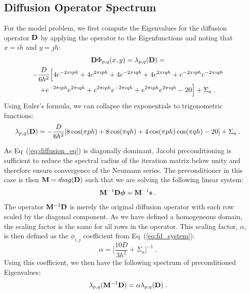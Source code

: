 \documentclass{mc2013}
\begin{document}
\subsection{Diffusion Operator Spectrum}
\label{subsec:diffusion_spectrum}

For the model problem, we first compute the Eigenvalues for the
diffusion operator $\mathbf{D}$ by applying the operator to the
Eigenfunctions and noting that $x=ih$ and $y=jh$:
\begin{multline}
  \mathbf{D}\Phi_{p,q}(x,y) = \lambda_{p,q}(\mathbf{D})
  =\\ -\frac{D}{6h^2}\Big[4 e^{-2 \pi \imath p h} + 4 e^{2 \pi \imath
      p h} + 4 e^{-2 \pi \imath q h} + 4 e^{2 \pi \imath q h} + e^{-2
      \pi \imath p h} e^{-2 \pi \imath q h} \\ + e^{-2 \pi \imath p h}
    e^{2 \pi \imath q h} + e^{2 \pi \imath p h} e^{-2 \pi \imath q h}
    + e^{2 \pi \imath p h} e^{2 \pi \imath q h} - 20\Big] + \Sigma_a
  \:.
  \label{eq:deriv_diff_1}
\end{multline}
Using Euler's formula, we can collapse the exponentials to
trigonometric functions:
\begin{equation}
  \lambda_{p,q}(\mathbf{D}) = -\frac{D}{6h^2}[ 8 \cos(\pi p h) + 8
    \cos(\pi q h) + 4 \cos(\pi p h) \cos(\pi q h) - 20] + \Sigma_a\:.
  \label{eq:deriv_diff_2}
\end{equation}

As Eq~(\ref{eq:diffusion_eq}) is diagonally dominant, Jacobi
preconditioning is sufficient to reduce the spectral radius of the
iteration matrix below unity and therefore ensure convergence of the
Neumann series. The preconditioner in this case is then $\mathbf{M} =
diag(\mathbf{D})$ such that we are solving the following linear system:
\begin{equation}
  \mathbf{M}^{-1} \mathbf{D} \boldsymbol{\phi} = \mathbf{M}^{-1} \mathbf{s}\:.
  \label{eq:precond_diffsion}
\end{equation}
The operator $\mathbf{M}^{-1} \mathbf{D}$ is merely the original diffusion
operator with each row scaled by the diagonal component. As we have
defined a homogeneous domain, the scaling factor is the same for all
rows in the operator. This scaling factor, $\alpha$, is then defined
as the $\phi_{i,j}$ coefficient from Eq~(\ref{eq:fd_system}):
\begin{equation}
  \alpha = \Bigg[\frac{10 D}{3 h^2} + \Sigma_a\Bigg]^{-1}\:.
  \label{eq:jacobi_scaling}
\end{equation}
Using this coefficient, we then have the following spectrum of
preconditioned Eigenvalues:
\begin{equation}
  \lambda_{p,q}(\mathbf{M}^{-1} \mathbf{D}) = \alpha \lambda_{p,q}(\mathbf{D})\:.
  \label{eq:preconditioned_Eigenvalues}
\end{equation}
\end{document}
